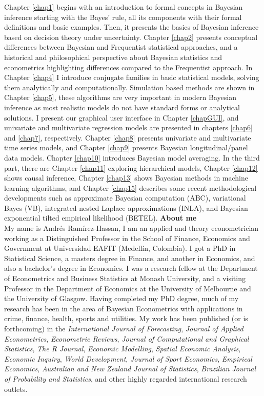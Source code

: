 Chapter \ref{chap1} begins with an introduction to formal concepts in Bayesian inference starting with the Bayes’ rule, all its components with their formal definitions and basic examples. Then, it presents the basics of Bayesian inference based on decision theory under uncertainty. Chapter \ref{chap2} presents conceptual differences between Bayesian and Frequentist statistical approaches, and a historical and philosophical perspective about Bayesian statistics and econometrics highlighting differences compared to the Frequentist approach. In Chapter \ref{chap4} I introduce conjugate families in basic statistical models, solving them analytically and computationally. Simulation based methods are shown in Chapter \ref{chap5}, these algorithms are very important in modern Bayesian inference as most realistic models do not have standard forms or analytical solutions. I present our graphical user interface in Chapter \ref{chapGUI}, and univariate and multivariate regression models are presented in chapters \ref{chap6} and \ref{chap7}, respectively. Chapter \ref{chap8} presents univariate and multivariate time series models, and Chapter \ref{chap9} presents Bayesian longitudinal/panel data models. Chapter \ref{chap10} introduces Bayesian model averaging. In the third part, there are Chapter \ref{chap11} exploring hierarchical models, Chapter \ref{chap12} shows causal inference, Chapter \ref{chap13} shows Bayesian methods in machine learning algorithms, and Chapter \ref{chap15} describes some recent methodological developments such as approximate Bayesian computation (ABC), variational Bayes (VB), integrated nested Laplace approximations (INLA), and Bayesian exponential tilted empirical likelihood (BETEL).
\clearpage
\textbf{About me}\\
My name is Andrés Ramírez-Hassan, I am an applied and theory econometrician working as a Distinguished Professor in the School of Finance, Economics and Government at Universidad EAFIT (Medellín, Colombia). I got a PhD in Statistical Science, a masters degree in Finance, and another in Economics, and also a bachelor’s degree in Economics. I was a research fellow at the Department of Econometrics and Business Statistics at Monash University, and a visiting Professor in the Department of Economics at the University of Melbourne and the University of Glasgow. Having completed my PhD degree, much of my research has been in the area of Bayesian Econometrics with applications in crime, finance, health, sports and utilities. My work has been published  (or is forthcoming) in the \textit{International Journal of Forecasting}, \textit{Journal of Applied Econometrics}, \textit{Econometric Reviews}, \textit{Journal of Computational and Graphical Statistics}, \textit{The R Journal}, \textit{Economic Modelling}, \textit{Spatial Economic Analysis}, \textit{Economic Inquiry}, \textit{World Development}, \textit{Journal of Sport Economics}, \textit{Empirical Economics}, \textit{Australian and New Zealand Journal of Statistics}, \textit{Brazilian Journal of Probability and Statistics}, and other highly regarded international research outlets.

